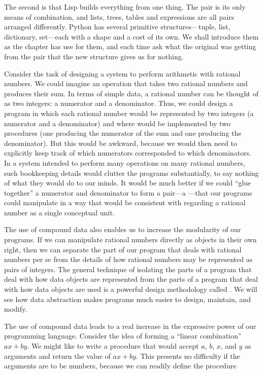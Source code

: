 The second is that Lisp builds everything from one thing.  The pair is its only
means of combination, and lists, trees, tables and expressions are all pairs
arranged differently.  Python has several primitive structures---tuple, list,
dictionary, set---each with a shape and a cost of its own.  We shall introduce
them as the chapter has use for them, and each time ask what the original was
getting from the pair that the new structure gives us for nothing.

Consider the task of designing a system to perform arithmetic with rational
numbers.  We could imagine an operation  that takes two rational
numbers and produces their sum.  In terms of simple data, a rational number can
be thought of as two integers: a numerator and a denominator.  Thus, we could
design a program in which each rational number would be represented by two
integers (a numerator and a denominator) and where  would be
implemented by two procedures (one producing the numerator of the sum and one
producing the denominator).  But this would be awkward, because we would then
need to explicitly keep track of which numerators corresponded to which
denominators.  In a system intended to perform many operations on many rational
numbers, such bookkeeping details would clutter the programs substantially, to
say nothing of what they would do to our minds.  It would be much better if we
could ``glue together'' a numerator and denominator to form a pair---a
---that our programs could manipulate in a way
that would be consistent with regarding a rational number as a single
conceptual unit.

The use of compound data also enables us to increase the modularity of our
programs.  If we can manipulate rational numbers directly as objects in their
own right, then we can separate the part of our program that deals with
rational numbers per se from the details of how rational numbers may be
represented as pairs of integers.  The general technique of isolating the parts
of a program that deal with how data objects are represented from the parts of
a program that deal with how data objects are used is a powerful design
methodology called .  We will see how data
abstraction makes programs much easier to design, maintain, and modify.

The use of compound data leads to a real increase in the expressive
power of our programming language.  Consider the idea of forming a
``linear combination'' \( ax + by \).  We might like to write
a procedure that would accept \( a \), \( b \), \( x \), and \( y \) as
arguments and return the value of \( ax + by \).  This
presents no difficulty if the arguments are to be numbers, because we
can readily define the procedure

